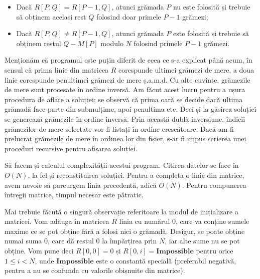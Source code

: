 \begin{itemize}

\item Dacă $R[P,Q] = R[P-1,Q]$, atunci grămada $P$ nu este folosită și trebuie
  să obținem același rest $Q$ folosind doar primele $P-1$ grămezi;

\item Dacă $R[P,Q] \neq R[P-1,Q]$, atunci grămada $P$ este folosită și trebuie
  să obținem restul $Q- M[P]$ modulo $N$ folosind primele $P-1$ grămezi.

\end{itemize}

Menționăm că programul este puțin diferit de ceea ce s-a explicat până acum,
în sensul că prima linie din matricea $R$ corespunde ultimei grămezi de mere,
a doua linie corespunde penultimei grămezi de mere ș.a.m.d. Cu alte cuvinte,
grămezile de mere sunt procesate în ordine inversă. Am făcut acest lucru
pentru a ușura procedura de aflare a soluției; se observă că prima oară se
decide dacă ultima grămadă face parte din submulțime, apoi penultima etc. Deci
și la găsirea soluției se generează grămezile în ordine inversă. Prin această
dublă inversiune, indicii grămezilor de mere selectate vor fi listați în
ordine crescătoare. Dacă am fi prelucrat grămezile de mere în ordinea lor din
fișier, s-ar fi impus scrierea unei proceduri recursive pentru afișarea
soluției.

Să facem și calculul complexității acestui program. Citirea datelor se face în
$O(N)$, la fel și reconstituirea soluției. Pentru a completa o linie din
matrice, avem nevoie să parcurgem linia precedentă, adică $O(N)$. Pentru
compunerea întregii matrice, timpul necesar este pătratic.

Mai trebuie făcută o singură observație referitoare la modul de inițializare a
matricei. Vom adăuga în matricea $R$ linia cu numărul 0, care va conține
sumele maxime ce se pot obține fără a folosi nici o grămadă. Desigur, se poate
obține numai suma 0, care dă restul 0 la împărțirea prin $N$, iar alte sume nu
se pot obține. Vom pune deci $R[0,0]=0$ și $R[0,i]=\mathbf{Impossible}$ pentru
orice $1 \leq i < N$, unde $\mathbf{Impossible}$ este o constantă specială
(preferabil negativă, pentru a nu se confunda cu valorile obișnuite din
matrice).

